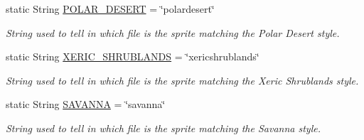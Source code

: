 \begin{DoxyCompactItemize}
static String \hyperlink{interfaceworld_1_1scenery_1_1_polar_desert_theme_a48dd1801e0146ea2306dadcbdee81b77}{P\-O\-L\-A\-R\-\_\-\-D\-E\-S\-E\-R\-T} = \char`\"{}polardesert\char`\"{}
\begin{DoxyCompactList}\small\item\em String used to tell in which file is the sprite matching the Polar Desert style. \end{DoxyCompactList}\item 
static String \hyperlink{interfaceworld_1_1scenery_1_1_xeric_shrublands_theme_a03cab029cbad9fdfa722122d3393c06c}{X\-E\-R\-I\-C\-\_\-\-S\-H\-R\-U\-B\-L\-A\-N\-D\-S} = \char`\"{}xericshrublands\char`\"{}
\begin{DoxyCompactList}\small\item\em String used to tell in which file is the sprite matching the Xeric Shrublands style. \end{DoxyCompactList}\item 
static String \hyperlink{interfaceworld_1_1scenery_1_1_savanna_theme_a69e8a9867db3a93074a41573940424b2}{S\-A\-V\-A\-N\-N\-A} = \char`\"{}savanna\char`\"{}
\begin{DoxyCompactList}\small\item\em String used to tell in which file is the sprite matching the Savanna style. \end{DoxyCompactList}\end{DoxyCompactItemize}
